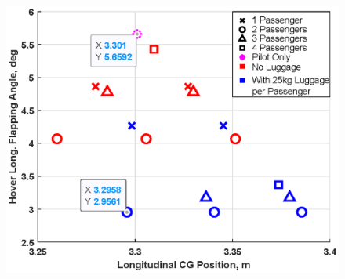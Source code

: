 \documentclass[11pt,a4paper]{article}
\begin{document}
\begin{appendices}
\begin{figure}[H]
\begin{minipage}{.49\textwidth}
  \label{fig:CGCRUISEF}
\end{minipage}\hspace{0.2cm}
\begin{minipage}{.49\textwidth}
  \centering
  \includegraphics[width=\linewidth]{CGHOVERF.eps}
  \label{fig:CGHOVERF}
\end{minipage}
\end{figure}
\end{appendices}{}
\thispagestyle{empty}


\end{document}
